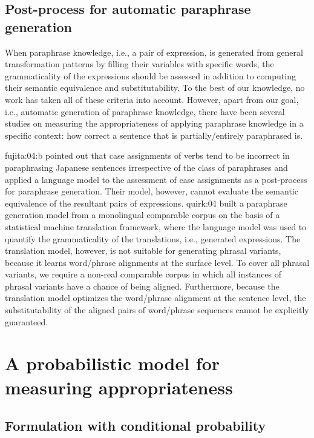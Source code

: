 \documentclass[english]{jnlp_1.4}
\newcommand{\newcite}{}
\begin{document}
\subsection{Post-process for automatic paraphrase generation}
\label{ssec:generation}

When paraphrase knowledge, i.e., a pair of expression, is generated
from general transformation patterns by filling their variables with
specific words, the grammaticality of the expressions should be
assessed in addition to computing their semantic equivalence and
substitutability.  To the best of our knowledge, no work has taken all
of these criteria into account.  However, apart from our goal, i.e.,
automatic generation of paraphrase knowledge, there have been several
studies on measuring the appropriateness of applying paraphrase
knowledge in a specific context: how correct a sentence that is
partially/entirely paraphrased is.

\newcite{fujita:04:b} pointed out that case assignments of verbs tend
to be incorrect in paraphrasing Japanese sentences irrespective of the
class of paraphrases and applied a language model to the assessment of
case assignments as a post-process for paraphrase generation.  Their
model, however, cannot evaluate the semantic equivalence of the
resultant pairs of expressions.
\newcite{quirk:04} built a paraphrase generation model from a
monolingual comparable corpus on the basis of a statistical machine
translation framework, where the language model was used to quantify
the grammaticality of the translations, i.e., generated expressions.
The translation model, however, is not suitable for generating phrasal
variants, because it learns word/phrase alignments at the surface
level.  To cover all phrasal variants, we require a non-real
comparable corpus in which all instances of phrasal variants have a
chance of being aligned.  Furthermore, because the translation model
optimizes the word/phrase alignment at the sentence level, the
substitutability of the aligned pairs of word/phrase sequences cannot
be explicitly guaranteed.




\section{A probabilistic model for measuring appropriateness}
\label{sec:proposed}

\subsection{Formulation with conditional probability}
\label{ssec:framework}
\end{document}

